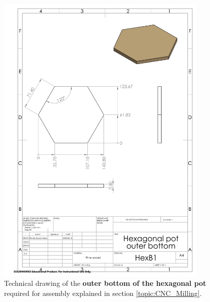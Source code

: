 \documentclass[12pt]{extarticle} %
\begin{document}
\begin{figure}[ht]
    \centering
    \includegraphics[width=0.9\textwidth]{images/technical_drawings/Hexagonal pot outer bottom-1.png}
    \caption{Technical drawing of the \textbf{outer bottom of the hexagonal pot} required for assembly explained in section \ref{topic:CNC_Milling}.}
    \label{technical_drawing:hex_pot_outer_bottom}
\end{figure}
\end{document}
